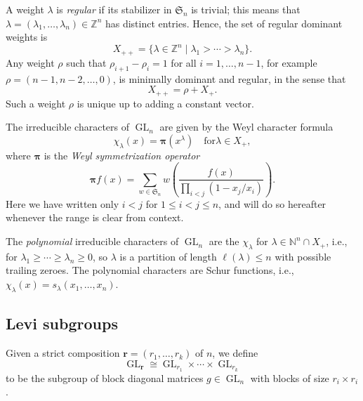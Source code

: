 \documentclass[12pt]{amsart}
\theoremstyle{definition}
\theoremstyle{remark}
\newcommand{\NN}{{\mathbb N}}
\newcommand{\ZZ}{{\mathbb Z}}
\newcommand{\rr}{{\mathbf r}}
\newcommand{\pibold}{{\boldsymbol \pi }}
\newcommand{\Weyl}{\pibold }
\newcommand{\Sfrak}{{\mathfrak S}}
\DeclareMathOperator{\GL}{GL}
\begin{document}
A weight $\lambda $ is {\em regular} if its stabilizer in $\Sfrak _{n}$
is trivial; this means that $\lambda = (\lambda _{1},\ldots,\lambda
_{n})\in \ZZ ^{n}$ has distinct entries.  Hence, the set of regular
dominant weights is
\begin{equation}\label{e:X++}
X_{++}  = \{\lambda \in \ZZ ^{n}\mid \lambda _{1}>
\cdots > \lambda _{n} \}.
\end{equation}
Any weight $\rho $ such that  $\rho_{i+1} - \rho_{i} = 1$ for all $i=1,\ldots,n-1$, for example $\rho =
(n-1,n-2,\ldots,0)$, is minimally dominant and regular, in the sense
that
\begin{equation}\label{e:plus-rho}
X_{++} = \rho +X_{+}.
\end{equation}
Such a weight $\rho $ is unique up to adding a constant vector.

The irreducible characters of $\GL _{n}$ are given by the Weyl
character formula
\begin{equation}\label{e:chi-lambda}
\chi _{\lambda }(x) = \Weyl (x^{\lambda }) \quad \text{for
$\lambda \in X_{+}$},
\end{equation}
where $\Weyl$ is the {\em Weyl
symmetrization operator}
\begin{equation}\label{e:Weyl-symmetrizer}
\Weyl f(x) = \sum _{w\in \Sfrak _{n}} w
\left(\frac{f(x)}{\prod _{i<j} (1-x_{j}/x_{i})}
\right).
\end{equation}
Here we have written only $i<j$ for $1\leq i<j\leq n$, and will do so hereafter whenever the range is clear from context.

The {\em polynomial} irreducible characters of $\GL _{n}$ are the
$\chi _{\lambda }$ for $\lambda \in \NN ^{n}\cap X_{+}$, i.e., for
$\lambda _{1}\geq \cdots \geq \lambda _{n}\geq 0$, so $\lambda $ is a
partition of length $\ell (\lambda )\leq n$ with possible trailing
zeroes.  The polynomial characters are Schur functions, i.e.,
$\chi _{\lambda }(x) = s_{\lambda }(x_{1},\ldots,x_{n})$.


\subsection{Levi subgroups}
\label{ss:levi}

Given a strict composition $\rr =(r_{1},\ldots,r_{k})$ of $n$, we define
\begin{equation}\label{e:GLr}
\GL _{\rr } \cong  \GL _{r_{1}}\times \cdots \times \GL _{r_{k}}
\end{equation}
to be the subgroup of block diagonal matrices $g\in \GL _{n}$ with
blocks of size $r_{i}\times r_{i}$.
\end{document}
